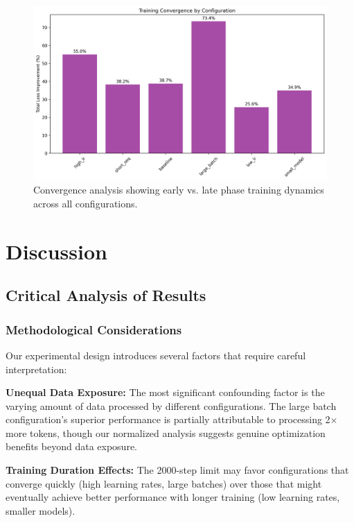 \documentclass[11pt,a4paper]{article}
\begin{document}
\begin{figure}[H]
    \centering
    \includegraphics[width=\linewidth]{research/convergence_analysis.png}
    \caption{Convergence analysis showing early vs. late phase training dynamics across all configurations.}
    \label{fig:convergence}
\end{figure}

\section{Discussion}

\subsection{Critical Analysis of Results}

\subsubsection{Methodological Considerations}
Our experimental design introduces several factors that require careful interpretation:

\textbf{Unequal Data Exposure:} The most significant confounding factor is the varying amount of data processed by different configurations. The large batch configuration's superior performance is partially attributable to processing 2× more tokens, though our normalized analysis suggests genuine optimization benefits beyond data exposure.

\textbf{Training Duration Effects:} The 2000-step limit may favor configurations that converge quickly (high learning rates, large batches) over those that might eventually achieve better performance with longer training (low learning rates, smaller models).
\end{document}
